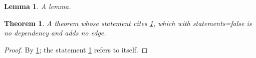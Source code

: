 \documentclass{article}
\newtheorem{theorem}{Theorem}
\newtheorem{lemma}{Lemma}
\begin{document}
\begin{lemma}\label{l}A lemma.\end{lemma}
\begin{theorem}\label{t}A theorem whose statement cites \ref{l}, which with
  statements=false is no dependency and adds no edge.\end{theorem}
\begin{proof}By \ref{l}; the statement \ref{t} refers to itself.\end{proof}
\end{document}
